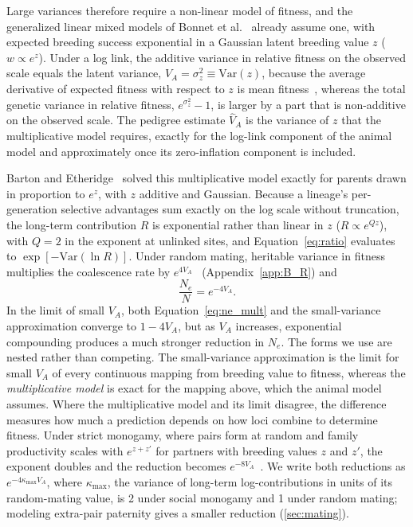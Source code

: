 \documentclass{article}
\begin{document}
Large variances therefore require a non-linear model of fitness, and the generalized linear mixed models of Bonnet et al.~\cite{bonnet2022} already assume one, with expected breeding success exponential in a Gaussian latent breeding value $z$ ($w \propto e^{z}$). Under a log link, the additive variance in relative fitness on the observed scale equals the latent variance, $V_A = \sigma_z^2 \equiv \mathrm{Var}(z)$, because the average derivative of expected fitness with respect to $z$ is mean fitness~\cite[Equations~15--16]{devillemereuil2016}, whereas the total genetic variance in relative fitness, $e^{\sigma_z^2} - 1$, is larger by a part that is non-additive on the observed scale. The pedigree estimate $\hat V_A$ is the variance of $z$ that the multiplicative model requires, exactly for the log-link component of the animal model and approximately once its zero-inflation component is included.

Barton and Etheridge~\cite{barton2011} solved this multiplicative model exactly for parents drawn in proportion to $e^{z}$, with $z$ additive and Gaussian. Because a lineage's per-generation selective advantages sum exactly on the log scale without truncation, the long-term contribution $R$ is exponential rather than linear in $z$ ($R \propto e^{Qz}$), with $Q = 2$ in the exponent at unlinked sites, and Equation~\eqref{eq:ratio} evaluates to $\exp[-\mathrm{Var}(\ln R)]$. Under random mating, heritable variance in fitness multiplies the coalescence rate by $e^{4V_A}$~\cite{barton2011,weissman2012} (Appendix~\ref{app:B_R}) and
\begin{equation}
    \frac{N_e}{N} = e^{-4V_A}. \label{eq:ne_mult}
\end{equation}
In the limit of small $V_A$, both Equation~\eqref{eq:ne_mult} and the small-variance approximation converge to $1 - 4V_A$, but as $V_A$ increases, exponential compounding produces a much stronger reduction in $N_e$. The forms we use are nested rather than competing. The small-variance approximation is the limit for small $V_A$ of every continuous mapping from breeding value to fitness, whereas the \emph{multiplicative model} is exact for the mapping above, which the animal model assumes. Where the multiplicative model and its limit disagree, the difference measures how much a prediction depends on how loci combine to determine fitness. Under strict monogamy, where pairs form at random and family productivity scales with $e^{z + z'}$ for partners with breeding values $z$ and $z'$, the exponent doubles and the reduction becomes $e^{-8V_A}$~\cite{weissman2012}. We write both reductions as $e^{-4\kappa_\text{max}V_A}$, where $\kappa_\text{max}$, the variance of long-term log-contributions in units of its random-mating value, is 2 under social monogamy and 1 under random mating; modeling extra-pair paternity gives a smaller reduction (\autoref{sec:mating}).
\end{document}
